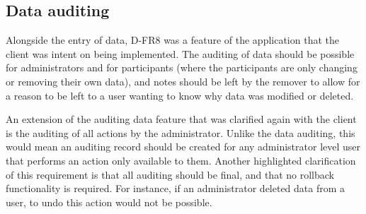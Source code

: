 \subsection{Data auditing}
Alongside the entry of data, D-FR8 was a feature of the application that the client was intent on being implemented. The auditing of data should be possible for administrators and for participants (where the participants are only changing or removing their own data), and notes should be left by the remover to allow for a reason to be left to a user wanting to know why data was modified or deleted. \par
An extension of the auditing data feature that was clarified again with the client is the auditing of all actions by the administrator. Unlike the data auditing, this would mean an auditing record should be created for any administrator level user that performs an action only available to them. Another highlighted clarification of this requirement is that all auditing should be final, and that no rollback functionality is required. For instance, if an administrator deleted data from a user, to undo this action would not be possible.
